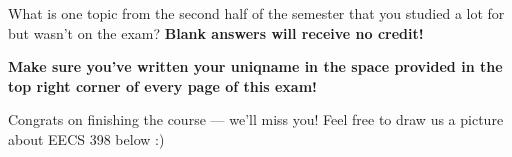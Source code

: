 \documentclass[twoside,12pt]{article}
\begin{document}
\begin{probset}

\begin{prob}[(4 pts)]

What is one topic from the second half of the semester that you studied a lot for but wasn't on the exam? \textbf{Blank answers will receive no credit!}

\begin{responsebox}{1.5in}

\end{responsebox}

\end{prob}

\vspace{0.5in}


\textbf{Make sure you've written your uniqname in the space provided in the top right corner of every page of this exam!}

Congrats on finishing the course --- we'll miss you! Feel free to draw us a picture about EECS 398 below :)


\begin{responsebox}{4.5in}
    
\end{responsebox}

\end{probset}
\end{document}
